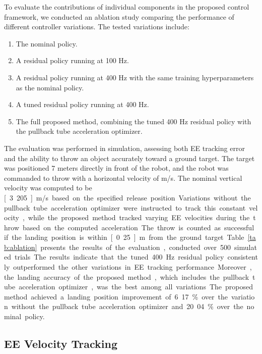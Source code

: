 \documentclass[letterpaper, 10 pt, conference]{ieeeconf} %
\begin{document}


To evaluate the contributions of individual components in the proposed control framework, we conducted an ablation study comparing the performance of different controller variations. The tested variations include:

\begin{enumerate}
    \item The nominal policy.
    \item A residual policy running at 100 Hz.
    \item A residual policy running at 400 Hz with the same training hyperparameters as the nominal policy.
    \item A tuned residual policy running at 400 Hz.
    \item The full proposed method, combining the tuned 400 Hz residual policy with the pullback tube acceleration optimizer.
\end{enumerate}

The evaluation was performed in simulation, assessing both EE tracking error and the ability to throw an object accurately toward a ground target. The target was positioned 7 meters directly in front of the robot, and the robot was commanded to throw with a horizontal velocity of \unit[7]{m/s}. The nominal vertical velocity was computed to be \unit[3.205]{m/s} based on the specified release position. Variations without the pullback tube acceleration optimizer were instructed to track this constant velocity, while the proposed method tracked varying EE velocities during the throw based on the computed acceleration. The throw is counted as successful if the landing position is within \unit[0.25]{m} from the ground target.

Table~\ref{tab:ablation} presents the results of the evaluation, conducted over 500 simulated trials. The results indicate that the tuned 400 Hz residual policy consistently outperformed the other variations in EE tracking performance. Moreover, the landing accuracy of the proposed method, which includes the pullback tube acceleration optimizer, was the best among all variations. The proposed method achieved a landing position improvement of 6.17\% over the variation without the pullback tube acceleration optimizer and 20.04\% over the nominal policy.

\subsection{EE Velocity Tracking}
\end{document}
